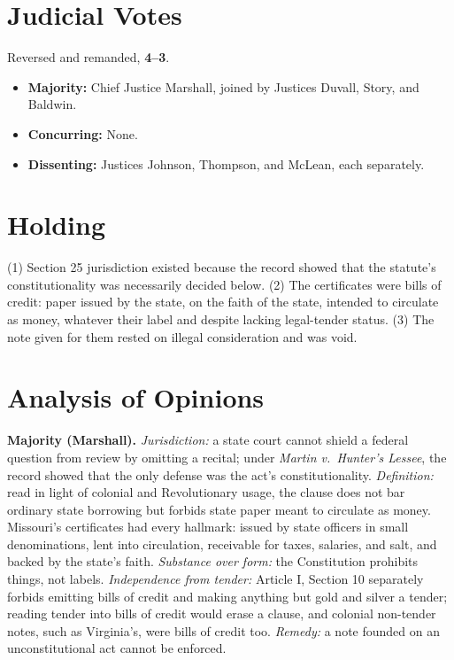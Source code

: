 \documentclass[12pt]{article}
\begin{document}
\section{Judicial Votes}

Reversed and remanded, \textbf{4--3}.
\begin{itemize}
\item \textbf{Majority:} Chief Justice Marshall, joined by Justices Duvall, Story, and Baldwin.
\item \textbf{Concurring:} None.
\item \textbf{Dissenting:} Justices Johnson, Thompson, and McLean, each separately.
\end{itemize}

\section{Holding}

(1) Section 25 jurisdiction existed because the record showed that the statute's constitutionality was necessarily decided below. (2) The certificates were bills of credit: paper issued by the state, on the faith of the state, intended to circulate as money, whatever their label and despite lacking legal-tender status. (3) The note given for them rested on illegal consideration and was void.

\section{Analysis of Opinions}

\textbf{Majority (Marshall).} \emph{Jurisdiction:} a state court cannot shield a federal question from review by omitting a recital; under \textit{Martin v.\ Hunter's Lessee}, the record showed that the only defense was the act's constitutionality. \emph{Definition:} read in light of colonial and Revolutionary usage, the clause does not bar ordinary state borrowing but forbids state paper meant to circulate as money. Missouri's certificates had every hallmark: issued by state officers in small denominations, lent into circulation, receivable for taxes, salaries, and salt, and backed by the state's faith. \emph{Substance over form:} the Constitution prohibits things, not labels. \emph{Independence from tender:} Article I, Section 10 separately forbids emitting bills of credit and making anything but gold and silver a tender; reading tender into bills of credit would erase a clause, and colonial non-tender notes, such as Virginia's, were bills of credit too. \emph{Remedy:} a note founded on an unconstitutional act cannot be enforced.
\end{document}
